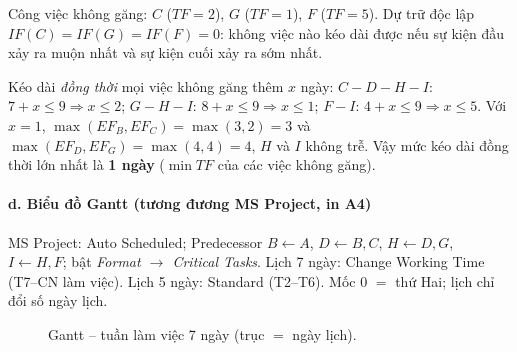 \documentclass[11pt,a4paper]{article}
\newcommand{\ganttrowseven}[5]{%
  \node[anchor=east,font=\scriptsize] at (-0.22,-#1+0.16) {#2};%
  \pgfmathtruncatemacro{\gLast}{#4-1}%
  \foreach \gK in {0,...,\gLast}{%
    \pgfmathtruncatemacro{\gStart}{#3+\gK}%
    \fill[#5] (\gStart,-#1) rectangle ++(1,0.32);%
  }%
}
\begin{document}
Công việc không găng: $C$ ($TF{=}2$), $G$ ($TF{=}1$), $F$ ($TF{=}5$).
Dự trữ độc lập $IF(C)=IF(G)=IF(F)=0$: không việc nào kéo dài được nếu sự kiện đầu xảy ra muộn nhất và sự kiện cuối xảy ra sớm nhất.

Kéo dài \emph{đồng thời} mọi việc không găng thêm $x$ ngày:
$C{-}D{-}H{-}I$: $7+x\le 9\Rightarrow x\le 2$;
$G{-}H{-}I$: $8+x\le 9\Rightarrow x\le 1$;
$F{-}I$: $4+x\le 9\Rightarrow x\le 5$.
Với $x=1$, $\max(EF_B,EF_C)=\max(3,2)=3$ và $\max(EF_D,EF_G)=\max(4,4)=4$, $H$ và $I$ không trễ. Vậy mức kéo dài đồng thời lớn nhất là \textbf{1 ngày} ($\min TF$ của các việc không găng).

\paragraph{d. Biểu đồ Gantt (tương đương MS Project, in A4)}
MS Project: Auto Scheduled; Predecessor $B{\leftarrow}A$, $D{\leftarrow}B,C$, $H{\leftarrow}D,G$, $I{\leftarrow}H,F$;
bật \textit{Format $\to$ Critical Tasks}.
Lịch 7 ngày: Change Working Time (T7--CN làm việc).
Lịch 5 ngày: Standard (T2--T6). Mốc 0 $=$ thứ Hai; lịch chỉ đổi số ngày lịch.

\begin{figure}[H]\centering
\vspace{-4pt}
\caption{Gantt -- tuần làm việc 7 ngày (trục $=$ ngày lịch).}
\end{figure}
\end{document}
